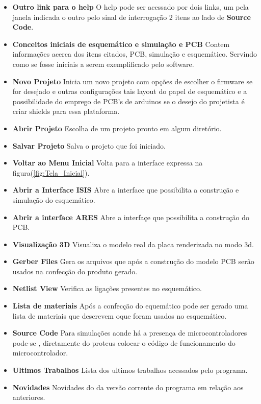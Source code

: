 \documentclass{Fabiano_file}
\begin{document}
\begin{itemize}
 \item \textbf{Outro link para o help} O help pode ser acessado por dois links, um pela janela indicada o outro pelo sinal de interrogação 2 
 itens ao lado de \textbf{Source Code}.
 \item \textbf{Conceitos iniciais de esquemático e simulação e PCB} Contem informações acerca dos itens citados, PCB, simulação e esquemático.
 Servindo como se fosse
 iniciais a serem exemplificado pelo software.
 \item \textbf{Novo Projeto} Inicia um novo projeto com opções de escolher o firmware se for desejado e outras configurações tais 
 layout do papel de esquemático
 e a possibilidade do emprego de PCB's de arduinos se o desejo do projetista é criar shields para essa plataforma.
 \item \textbf{Abrir Projeto} Escolha de um projeto pronto em algum diretório.
 \item \textbf{Salvar Projeto} Salva o projeto que foi iniciado.
 \item \textbf{Voltar ao Menu Inicial} Volta  para a interface expressa na figura(\ref{fig:Tela_Inicial}).
 \item \textbf{Abrir a Interface ISIS} Abre a interface que possibilita a construção e simulação do esquemático.
 \item \textbf{Abrir a interface ARES} Abre a interfaçe que possibilita a construção do PCB.
 \item \textbf{Visualização 3D} Visualiza o modelo real da placa renderizada no modo 3d.
 \item \textbf{Gerber Files} Gera os arquivos que após a construção do modelo PCB serão usados na confecção do produto gerado.
 \item \textbf{Netlist View} Verifica as ligações presentes no esquemático.
 \item \textbf{Lista de materiais} Após a confecção do equemático pode ser gerado uma lista de materiais que descrevem oque foram usados no esquemático.
 \item \textbf{Source Code} Para simulações aonde há a presença de microcontroladores pode-se , diretamente do proteus colocar o código de funcionamento do 
 microcontrolador.
 \item \textbf{Ultimos Trabalhos} Lista dos ultimos trabalhos acessados pelo programa.
 \item \textbf{Novidades} Novidades do da versão corrente do programa em relação aos anteriores.
 \end{itemize}
\end{document}
